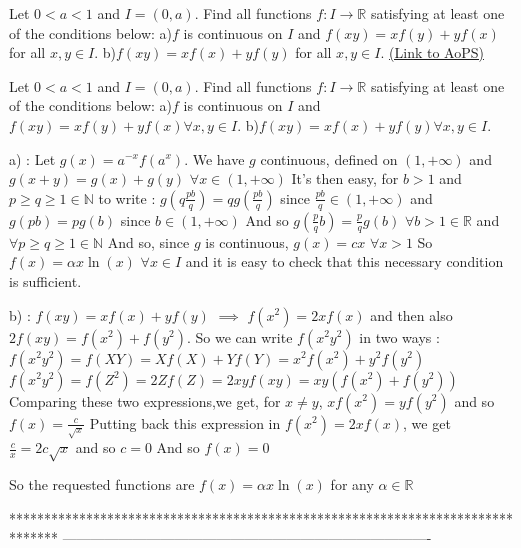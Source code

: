 \begin{problem}
	Let $ 0<a<1$ and $ I=(0,a)$. Find all functions $ f: I\to\mathbb{R}$ satisfying at least one of the conditions below:
a)$ f$ is continuous on $ I$ and $ f(xy)=xf(y)+yf(x)$ for all $x,y\in I$.
b)$ f(xy)=xf(x)+yf(y)$ for all $x,y\in I$.
	\flushright \href{https://artofproblemsolving.com/community/c6h163498}{(Link to AoPS)}
\end{problem}



\begin{mysolution}
	\begin{tcolorbox}Let $ 0 < a < 1$ and $ I = (0,a)$. Find all functions $ f: I\to\mathbb{R}$ satisfying at least one of the conditions below:
a)$ f$ is continuous on $ I$ and $ f(xy) = xf(y)+yf(x)\forall x,y\in I$.
b)$ f(xy) = xf(x)+yf(y)\forall x,y\in I.$\end{tcolorbox}

a) : Let $ g(x)=a^{-x}f(a^{x})$. We have $ g$ continuous,  defined on $ (1,+\infty)$ and $ g(x+y)=g(x)+g(y)$ $ \forall x\in (1,+\infty)$
It's then easy, for $ b>1$ and $ p\geq q\geq 1\in\mathbb{N}$ to write :
$ g(q\frac{pb}{q})=qg(\frac{pb}{q})$ since $ \frac{pb}{q}\in(1,+\infty)$ and $ g(pb)=pg(b)$ since $ b\in(1,+\infty)$
And so $ g(\frac{p}{q}b)=\frac{p}{q}g(b)$ $ \forall b>1\in\mathbb{R}$ and $ \forall p\geq q\geq 1\in\mathbb{N}$
And so, since $ g$ is continuous, $ g(x)=cx$ $ \forall x>1$ 
So $ f(x)=\alpha x\ln(x)$ $ \forall x\in I$ and it is easy to check that this necessary condition is sufficient.

b) : $ f(xy)=xf(x)+yf(y)$ $ \implies$ $ f(x^{2})=2xf(x)$ and then also $ 2f(xy)=f(x^{2})+f(y^{2})$. So we can write $ f(x^{2}y^{2})$ in two ways :
$ f(x^{2}y^{2})=f(XY)=Xf(X)+Yf(Y)=x^{2}f(x^{2})+y^{2}f(y^{2})$
$ f(x^{2}y^{2})=f(Z^{2})=2Zf(Z)=2xyf(xy)=xy(f(x^{2})+f(y^{2}))$
Comparing these two expressions,we get, for $ x\neq y$, $ xf(x^{2})=yf(y^{2})$ and so $ f(x)=\frac{c}{\sqrt{x}}$
Putting back this expression in $ f(x^{2})=2xf(x)$, we get $ \frac{c}{x}=2c\sqrt{x}$ and so $ c=0$
And so $ f(x)=0$

So the requested functions are $ f(x)=\alpha x\ln(x)$ for any $ \alpha\in\mathbb{R}$
\end{mysolution}
*******************************************************************************
-------------------------------------------------------------------------------

